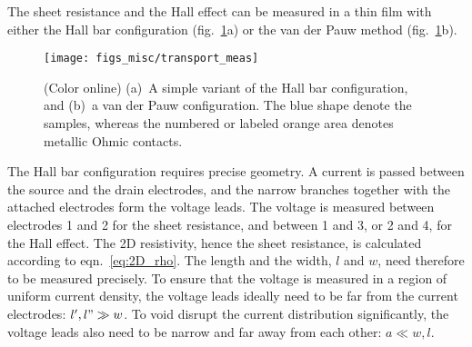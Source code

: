 The sheet resistance and the Hall effect can be measured in a thin film with either the Hall bar configuration (fig.~\ref{fig:transport_meas}a) or the van der Pauw method (fig.~\ref{fig:transport_meas}b).%
\begin{figure}[ht]%
	\centering%
    \texttt{[image: figs\_misc/transport\_meas]}%
    \caption[Hall bar and van der Pauw configuration]{\label{fig:transport_meas}(Color online) (a)~A simple variant of the Hall bar configuration, and (b)~a van der Pauw configuration. The blue shape denote the samples, whereas the numbered or labeled orange area denotes metallic Ohmic contacts.}%
\end{figure}%

The Hall bar configuration requires precise geometry. A current is passed between the source and the drain electrodes, and the narrow branches together with the attached electrodes form the voltage leads. The voltage is measured between electrodes 1 and 2 for the sheet resistance, and between 1 and 3, or 2 and 4, for the Hall effect. The 2D resistivity, hence the sheet resistance, is calculated according to eqn.~\ref{eq:2D_rho}. The length and the width, $l$ and $w$, need therefore to be measured precisely. To ensure that the voltage is measured in a region of uniform current density, the voltage leads ideally need to be far from the current electrodes: $l', l" \gg w$. To void disrupt the current distribution significantly, the voltage leads also need to be narrow and far away from each other: $a \ll w, l$.

